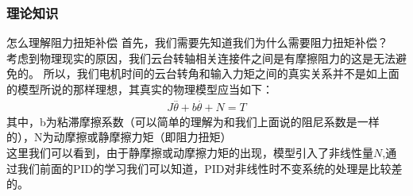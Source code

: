 \documentclass[UTF8,a4paper,12pt]{ctexart}
\begin{document}
          \subsubsection{理论知识}
          \begin{titlebox}{怎么理解阻力扭矩补偿}
            首先，我们需要先知道我们为什么需要阻力扭矩补偿？\\
            考虑到物理现实的原因，我们云台转轴相关连接件之间是有摩擦阻力的这是无法避免的。
            所以，我们电机时间的云台转角和输入力矩之间的真实关系并不是如上面的模型所说的那样理想，其真实的物理模型应当如下：
            \begin{align*}
              J\overset{..}{\theta}+b\overset{.}{\theta}+N=T
           \end{align*}
           其中，b为粘滞摩擦系数（可以简单的理解为和我们上面说的阻尼系数是一样的），N为动摩擦或静摩擦力矩（即阻力扭矩）
           \\这里我们可以看到，由于静摩擦或动摩擦力矩的出现，模型引入了非线性量$N$,通过我们前面的PID的学习我们可以知道，PID对非线性时不变系统的处理是比较差的。
           

\end{titlebox}
\end{document}
